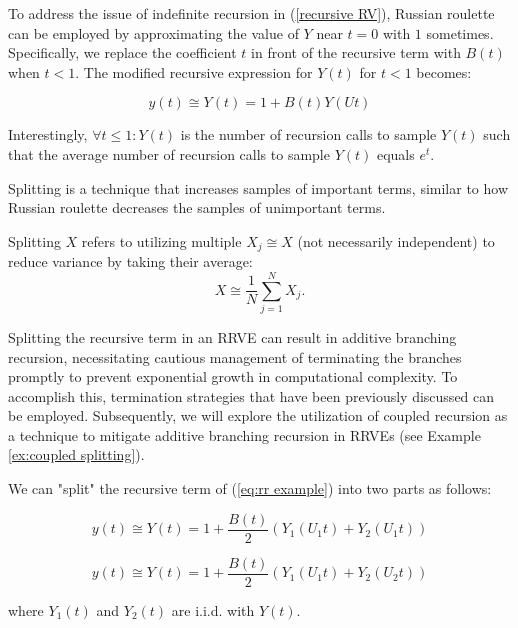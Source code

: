 \documentclass[a4paper,12pt]{article}
\begin{document}
\begin{example} \label{ex: russian roulette}
  To address the issue of indefinite recursion in
  (\ref{recursive RV}), Russian roulette can be employed
  by approximating the value of $Y$ near $t = 0$ with $1$
  sometimes. Specifically, we replace the coefficient $t$
  in front of the recursive term with $B(t)$ when $t < 1$.
  The modified recursive expression for $Y(t)$ for $t<1$ becomes:

  \begin{equation}\label{eq:rr example}
    y(t) \cong Y(t) = 1 + B(t)Y(Ut)
  \end{equation}

  Interestingly, $\forall t \le 1:Y(t)$ is the number of recursion calls
  to sample $Y(t)$ such that the average number of recursion
  calls to sample $Y(t)$ equals $e^{t}$.

\end{example}

Splitting is a technique that increases samples of important terms, similar to how Russian roulette
decreases the samples of unimportant terms.

\begin{definition}[splitting] \label{def:splitting}
  Splitting $X$ refers to utilizing multiple $X_{j} \cong X$ (not necessarily independent) to
  reduce variance by taking their average:
  \begin{equation}
    X \cong \frac{1}{N} \sum_{j=1}^{N} X_{j}.
  \end{equation}
\end{definition}

Splitting the recursive term in an RRVE can result in additive branching recursion,
necessitating cautious management of terminating the branches promptly to prevent
exponential growth in computational complexity. To accomplish this, termination
strategies that have been previously discussed can be employed. Subsequently,
we will explore the utilization of coupled recursion as a technique to mitigate
additive branching recursion in RRVEs (see Example \ref{ex:coupled splitting}).

\begin{example} \label{ex:splitting}
  We can "split" the recursive term of (\ref{eq:rr example})
  into two parts as follows:

  \begin{equation}\label{eq:splitting}
    y(t) \cong Y(t) =1 + \frac{B(t)}{2}(Y_{1}(U_{1}t) + Y_{2}(U_{1}t))
  \end{equation}


  \begin{equation}\label{eq:splitting2}
    y(t) \cong Y(t) =1 + \frac{B(t)}{2}(Y_{1}(U_{1}t) + Y_{2}(U_{2}t))
  \end{equation}


  where $Y_{1}(t)$ and $Y_{2}(t)$ are i.i.d. with $Y(t)$.
\end{example}
\end{document}
